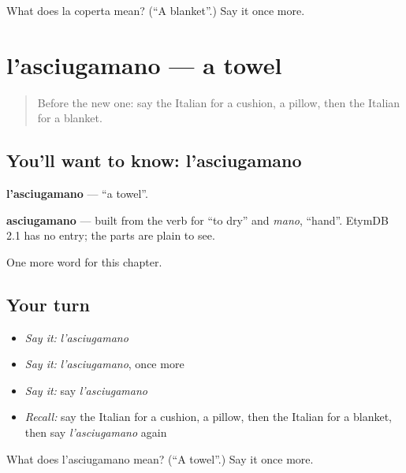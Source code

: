 \begin{tcolorbox}[breakable,colback=teal!4,colframe=teal!35!black,title={Before you move on}]
What does la coperta mean? (\textquotedblleft{}A blanket\textquotedblright{}.) Say it once more.
\end{tcolorbox}
\section[l'asciugamano]{l'asciugamano — a towel}

\label{lesson:IT-C96-asciugamano}



\begin{quote}
Before the new one: say the Italian for a cushion, a pillow, then the Italian for a blanket.
\end{quote}

\subsection*{You'll want to know: l'asciugamano}
\textbf{l'asciugamano} — \textquotedblleft{}a towel\textquotedblright{}.

\begin{cousinweb}
\textbf{asciugamano} — built from the verb for \textquotedblleft{}to dry\textquotedblright{} and \emph{mano}, \textquotedblleft{}hand\textquotedblright{}. EtymDB 2.1 has no entry; the parts are plain to see.
\end{cousinweb}

\begin{grammarlens}[title={What you've built}]
One more word for this chapter.
\end{grammarlens}

\subsection*{Your turn}
\begin{itemize}
\raggedright
  \item \emph{Say it:} \emph{l'asciugamano}
  \item \emph{Say it:} \emph{l'asciugamano}, once more
  \item \emph{Say it:} say \emph{l'asciugamano}
  \item \emph{Recall:} say the Italian for a cushion, a pillow, then the Italian for a blanket, then say \emph{l'asciugamano} again
\end{itemize}

\begin{tcolorbox}[breakable,colback=teal!4,colframe=teal!35!black,title={Before you move on}]
What does l'asciugamano mean? (\textquotedblleft{}A towel\textquotedblright{}.) Say it once more.
\end{tcolorbox}
